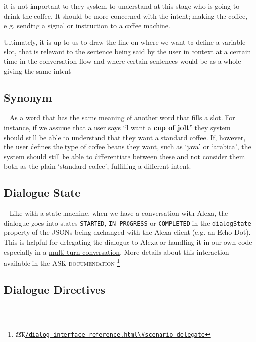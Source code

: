 
	it is not important to they system to understand at this stage who is going to drink the coffee. It should be more concerned with the intent; making the coffee, e g. sending a signal or instruction to a coffee machine.
	 
	Ultimately, it is up to us to draw the line on where we want to define a variable slot, that is relevant to the sentence being said by the user in context at a certain time in the conversation flow and where certain sentences would be as a whole giving the same intent
	
	
	\subsection*{Synonym}~\label{synonym:def}
	As a word that has the same meaning of another word that fills a slot. For instance, if we assume that a user says ``I want a \textbf{cup of jolt}'' they system should still be able to understand that they want a standard coffee. If, however, the user defines the type of coffee beans they want, such as `java' or `arabica', the system should still be able to differentiate between these and not consider them both as the plain `standard coffee', fulfilling a different intent. 
	
	\subsection*{Dialogue State}~\label{dialogState}
	Like with a state machine, when we have a conversation with Alexa, the dialogue goes into states \texttt{STARTED}, \texttt{IN_PROGRESS} or \texttt{COMPLETED} in the \texttt{dialogState} property of the JSONs being exchanged with the Alexa client (e.g. an Echo Dot). This is helpful for delegating the dialogue to Alexa or handling it in our own code especially in a \hyperlink{multiturn:def}{multi-turn conversation}. More details about this interaction available in the \textsc{ASK documentation} \footnote{\t{a\t{sk}}\href{https://developer.amazon.com/docs/custom-skills/dialog-interface-reference.html\#scenario-delegate}{\lstinline|/dialog-interface-reference.html\#scenario-delegate|}}
	
	

	\subsection*{Dialogue Directives}~\label{directives:def}
	
